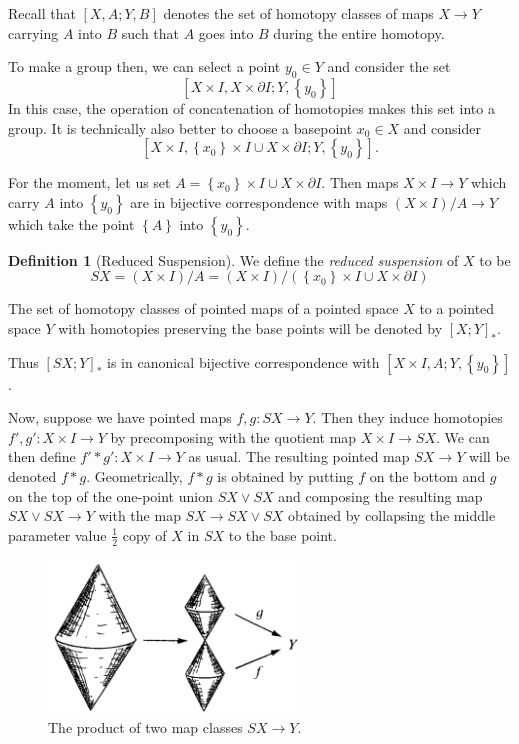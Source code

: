 \documentclass[reqno]{amsart}
\theoremstyle{definition}
\newtheorem{definition}[theorem]{Definition}
\theoremstyle{remark}
\begin{document}
Recall that $\left[ X,A ; Y ,B \right] $ denotes the
set of homotopy classes of maps $X \to Y$ carrying $A$ into
$B$ such that $A$ goes into $B$ during the entire homotopy.

To make a group then, we can select a point $y_0 \in Y$ and
consider the set
\[
\left[ X \times I, X \times \partial I ;
Y , \left\{ y_0 \right\} \right] 
\] 
In this case, the operation of concatenation of homotopies
makes this set into a group.
It is technically also better to choose a basepoint 
$x_0 \in X$ and consider
\[
\left[ X \times I, \left\{ x_0 \right\} \times I
\cup X \times \partial I ; Y , \left\{ y_0 \right\} \right] .
\] 

For the moment, let us set
$A = \left\{ x_0 \right\} \times I \cup 
X \times \partial I$. Then maps
$X \times I \to Y$ which carry $A$ into $\left\{ y_0 \right\} $ 
are in bijective correspondence with maps 
$\left( X \times I \right) / A \to Y$ which take
 the point $\left\{ A \right\} $ into 
 $\left\{ y_0 \right\} $. 
 
 \begin{definition}[Reduced Suspension]
     We define the \textit{reduced suspension} of
     $X$ to be
     \[
     SX = (X \times I) / A =
     \left( X \times I \right) /
     \left( \left\{ x_0 \right\} \times I
     \cup X \times \partial I \right) 
     \] 
 \end{definition}

 The set of homotopy classes of pointed maps
 of a pointed space $X$ to a pointed space $Y$ with
 homotopies preserving the base points will
 be denoted by $\left[ X;Y \right]_* $. 

 Thus
 $\left[ SX;Y \right]_* $ is in canonical bijective
 correspondence with
 $\left[ X \times I, A ; Y , \left\{ y_0 \right\}  \right] $.


 Now, suppose we have pointed maps
 $f,g \colon SX \to Y$. Then they
 induce homotopies
 $f',g' \colon X \times I \to Y$ by precomposing with the
 quotient map
  $X\times I \to SX$. We can then define
  $f' * g' \colon X \times I \to Y$ as usual.
  The resulting pointed map
  $SX \to Y$ will be denoted $f * g$.
  Geometrically, $f * g$ is obtained by
  putting $f$ on the bottom and $g$ on the top
  of the one-point union $SX \vee SX$ and composing
  the resulting map $SX \vee SX \to Y$ with the
  map $SX \to SX \vee SX$ obtained by collapsing the
  middle parameter value $\frac{1}{2}$ copy of
  $X$ in $SX$ to the base point.
  
  \begin{figure}[htpb]
      \centering
      \includegraphics[width=0.6\textwidth]{TKISO0932.png}
      \caption{The product of two map classes
      $SX \to Y$.}
      \label{fig:TKISO0932-png}
  \end{figure}
\end{document}
